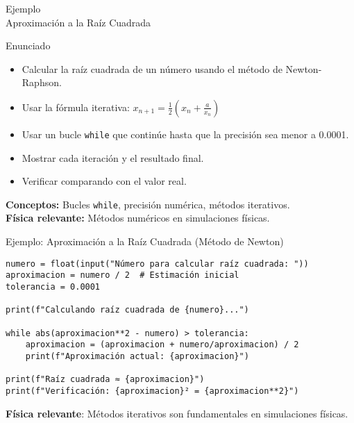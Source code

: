\documentclass[10pt]{beamer}
\begin{document}
\begin{frame}{Ejemplo \\ Aproximación a la Raíz Cuadrada}
  \begin{block}{Enunciado}
    \begin{itemize}
      \item Calcular la raíz cuadrada de un número usando el método de Newton-Raphson.
      \item Usar la fórmula iterativa: $x_{n+1} = \frac{1}{2}(x_n + \frac{a}{x_n})$
      \item Usar un bucle \texttt{while} que continúe hasta que la precisión sea menor a 0.0001.
      \item Mostrar cada iteración y el resultado final.
      \item Verificar comparando con el valor real.
    \end{itemize}
  \end{block}
  
  \textbf{Conceptos:} Bucles \texttt{while}, precisión numérica, métodos iterativos.
  \\
  \textbf{Física relevante:} Métodos numéricos en simulaciones físicas.
\end{frame}

\begin{frame}[fragile]{Ejemplo: Aproximación a la Raíz Cuadrada (Método de Newton)}
\begin{verbatim}
numero = float(input("Número para calcular raíz cuadrada: "))
aproximacion = numero / 2  # Estimación inicial
tolerancia = 0.0001

print(f"Calculando raíz cuadrada de {numero}...")

while abs(aproximacion**2 - numero) > tolerancia:
    aproximacion = (aproximacion + numero/aproximacion) / 2
    print(f"Aproximación actual: {aproximacion}")

print(f"Raíz cuadrada ≈ {aproximacion}")
print(f"Verificación: {aproximacion}² = {aproximacion**2}")
\end{verbatim}

\textbf{Física relevante}: Métodos iterativos son fundamentales en simulaciones físicas.
\end{frame}
\end{document}
